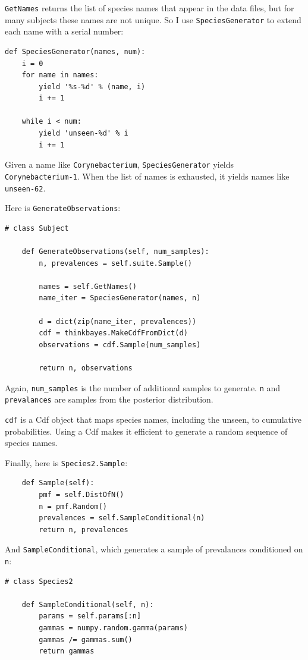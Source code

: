 \documentclass[12pt]{book}
\begin{document}
{\tt GetNames} returns the list of species names that appear in
the data files, but for many subjects these names are not unique.
So I use {\tt SpeciesGenerator} to extend each name with a serial
number:

\begin{verbatim}
def SpeciesGenerator(names, num):
    i = 0
    for name in names:
        yield '%s-%d' % (name, i)
        i += 1

    while i < num:
        yield 'unseen-%d' % i
        i += 1
\end{verbatim}

Given a name like {\tt Corynebacterium}, {\tt SpeciesGenerator} yields
{\tt Corynebacterium-1}.  When the list of names is exhausted, it
yields names like {\tt unseen-62}.

Here is {\tt GenerateObservations}:

\begin{verbatim}
# class Subject

    def GenerateObservations(self, num_samples):
        n, prevalences = self.suite.Sample()

        names = self.GetNames()
        name_iter = SpeciesGenerator(names, n)

        d = dict(zip(name_iter, prevalences))
        cdf = thinkbayes.MakeCdfFromDict(d)
        observations = cdf.Sample(num_samples)

        return n, observations
\end{verbatim}

Again, \verb"num_samples" is the number of additional samples
to generate.  {\tt n} and {\tt prevalances} are samples from
the posterior distribution.

{\tt cdf} is a Cdf object that maps species names, including the
unseen, to cumulative probabilities.  Using a Cdf makes it efficient
to generate a random sequence of species names.

Finally, here is {\tt Species2.Sample}:

\begin{verbatim}
    def Sample(self):
        pmf = self.DistOfN()
        n = pmf.Random()
        prevalences = self.SampleConditional(n)
        return n, prevalences
\end{verbatim}

And {\tt SampleConditional}, which generates a sample of
prevalances conditioned on {\tt n}:

\begin{verbatim}
# class Species2

    def SampleConditional(self, n):
        params = self.params[:n]
        gammas = numpy.random.gamma(params)
        gammas /= gammas.sum()
        return gammas
\end{verbatim}
\end{document}
